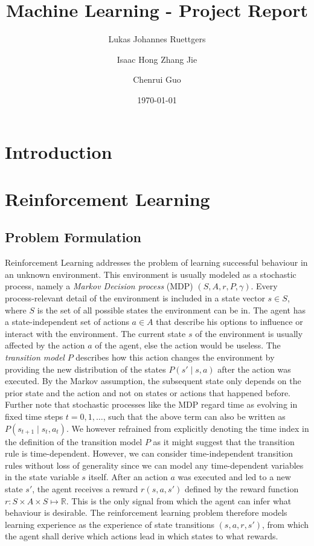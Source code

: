 \documentclass[a4paper, 11pt]{article}
\title{Machine Learning -  Project Report}
\author{Lukas Johannes Ruettgers \and Isaac Hong Zhang Jie \and Chenrui Guo}
\date{\today}
\begin{document}
	\maketitle
	\section{Introduction}
	\section{Reinforcement Learning}
	\subsection{Problem Formulation}
	Reinforcement Learning addresses the problem of learning successful behaviour in an unknown environment. This environment is usually modeled as a stochastic process, namely a \textit{Markov Decision process} (MDP) $(S,A,r,P,\gamma)$. Every process-relevant detail of the environment is included in a state vector $s\in S$, where $S$ is the set of all possible states the environment can be in. The agent has a state-independent set of actions $a\in A$ that describe his options to influence or interact with the environment. The current state $s$ of the environment is usually affected by the action $a$ of the agent, else the action would be useless. 
	The \textit{transition model} $P$ describes how this action changes the environment by providing the new distribution of the states $P(s'\mid s,a)$ after the action was executed. By the Markov assumption, the subsequent state only depends on the prior state and the action and not on states or actions that happened before. Further note that stochastic processes like the MDP regard time as evolving in fixed time steps $t=0,1,\dots$, such that the above term can also be written as $P(s_{t+1}\mid s_t,a_t)$. We however refrained from explicitly denoting the time index in the definition of the transition model $P$ as it might suggest that the transition rule is time-dependent. However, we can consider time-independent transition rules without loss of generality since we can model any time-dependent variables in the state variable $s$ itself. 
	After an action $a$ was executed and led to a new state $s'$, the agent receives a reward $r(s,a,s')$ defined by the reward function $r:S\times A\times S \mapsto \mathbb{R}$. This is the only signal from which the agent can infer what behaviour is desirable. 
	The reinforcement learning problem therefore models learning experience as the experience of state transitions $(s,a,r,s')$, from which the agent shall derive which actions lead in which states to what rewards.
\end{document}
